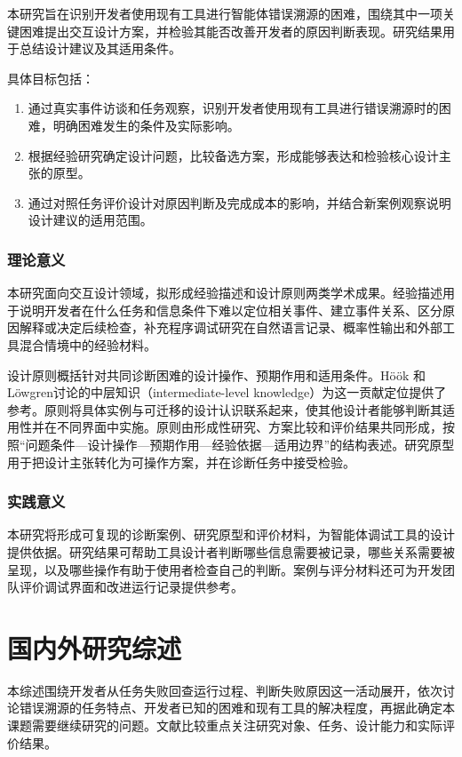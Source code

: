 本研究旨在识别开发者使用现有工具进行智能体错误溯源的困难，围绕其中一项关键困难提出交互设计方案，并检验其能否改善开发者的原因判断表现。研究结果用于总结设计建议及其适用条件。

具体目标包括：

\begin{enumerate}
\item 通过真实事件访谈和任务观察，识别开发者使用现有工具进行错误溯源时的困难，明确困难发生的条件及实际影响。
\item 根据经验研究确定设计问题，比较备选方案，形成能够表达和检验核心设计主张的原型。
\item 通过对照任务评价设计对原因判断及完成成本的影响，并结合新案例观察说明设计建议的适用范围。
\end{enumerate}

\subsubsection{理论意义}

本研究面向交互设计领域，拟形成经验描述和设计原则两类学术成果。经验描述用于说明开发者在什么任务和信息条件下难以定位相关事件、建立事件关系、区分原因解释或决定后续检查，补充程序调试研究在自然语言记录、概率性输出和外部工具混合情境中的经验材料。

设计原则概括针对共同诊断困难的设计操作、预期作用和适用条件。Höök 和 Löwgren\cite{hook2012strong}讨论的中层知识（intermediate-level knowledge）为这一贡献定位提供了参考。原则将具体实例与可迁移的设计认识联系起来，使其他设计者能够判断其适用性并在不同界面中实施。原则由形成性研究、方案比较和评价结果共同形成，按照“问题条件—设计操作—预期作用—经验依据—适用边界”的结构表述。研究原型用于把设计主张转化为可操作方案，并在诊断任务中接受检验。

\subsubsection{实践意义}

本研究将形成可复现的诊断案例、研究原型和评价材料，为智能体调试工具的设计提供依据。研究结果可帮助工具设计者判断哪些信息需要被记录，哪些关系需要被呈现，以及哪些操作有助于使用者检查自己的判断。案例与评分材料还可为开发团队评价调试界面和改进运行记录提供参考。

\section{国内外研究综述}

本综述围绕开发者从任务失败回查运行过程、判断失败原因这一活动展开，依次讨论错误溯源的任务特点、开发者已知的困难和现有工具的解决程度，再据此确定本课题需要继续研究的问题。文献比较重点关注研究对象、任务、设计能力和实际评价结果。

